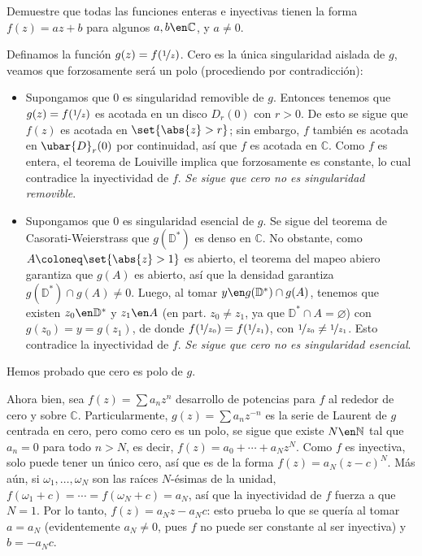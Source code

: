 \setcounter{eje}{13}
\begin{ejer}
Demuestre que todas las funciones enteras e inyectivas tienen la forma $f(z) = az+b$ para algunos $a, b \en \mathbb{C}$, y $a \neq 0$.
\end{ejer}
\begin{sol}
Definamos la función $g(z) = f(\nicefrac{1}{z})$. Cero es la única singularidad aislada de $g$, veamos que forzosamente será un polo (procediendo por contradicción):
\begin{itemize}[leftmargin=1em]
\item Supongamos que $0$ es singularidad removible de $g$. Entonces tenemos que $g(z) = f(\nicefrac{1}{z})$ es acotada en un disco $D_r(0)$ con $r>0$. De esto se sigue que $f(z)$ es acotada en $\set{\abs{z} > r}$; sin embargo, $f$ también es acotada en $\ubar{D}_r(0)$ por continuidad, así que $f$ es acotada en $\mathbb{C}$. Como $f$ es entera, el teorema de Louiville implica que forzosamente es constante, lo cual contradice la inyectividad de $f$. \emph{Se sigue que cero no es singularidad removible}.

\item Supongamos que $0$ es singularidad esencial de $g$. Se sigue del teorema de Casorati-Weierstrass que $g(\mathbb{D}^*)$ es denso en $\mathbb{C}$. No obstante, como $A\coloneq\set{\abs{z}>1}$ es abierto, el teorema del mapeo abiero garantiza que $g(A)$ es abierto, así que la densidad garantiza $g(\mathbb{D}^*) \cap g(A) \neq 0$. Luego, al tomar $y\en g(\mathbb{D}^*) \cap g(A)$, tenemos que existen $z_0\en\mathbb{D}^*$ y $z_1\en A$ (en part. $z_0\neq z_1$, ya que $\mathbb{D}^* \cap A = \varnothing$) con $g(z_0) = y = g(z_1)$, de donde $f(\nicefrac{1}{z_0}) = f(\nicefrac{1}{z_1})$, con $\nicefrac{1}{z_0} \neq \nicefrac{1}{z_1}$. Esto contradice la inyectividad de $f$. \emph{Se sigue que cero no es singularidad esencial}.
\end{itemize}
Hemos probado que cero es polo de $g$.\par
Ahora bien, sea $f(z) = \sum a_nz^n$ desarrollo de potencias para $f$ al rededor de cero y sobre $\mathbb{C}$. Particularmente, $g(z) = \sum a_n z^{-n}$ es la serie de Laurent de $g$ centrada en cero, pero como cero es un polo, se sigue que existe $N\en\mathbb{N}$ tal que $a_n = 0$ para todo $n>N$, es decir, $f(z) = a_0+\cdots+a_Nz^N$. Como $f$ es inyectiva, solo puede tener un único cero, así que es de la forma $f(z) = a_N(z-c)^N$. Más aún, si $\omega_1,\dots,\omega_N$ son las raíces $N$-ésimas de la unidad, $f(\omega_1+c) = \cdots=f(\omega_N+c) = a_N$, así que la inyectividad de $f$ fuerza a que $N=1$. Por lo tanto, $f(z) = a_Nz - a_Nc$: esto prueba lo que se quería al tomar $a = a_N$ (evidentemente $a_N \neq0$, pues $f$ no puede ser constante al ser inyectiva) y $b = -a_Nc$.
\end{sol}